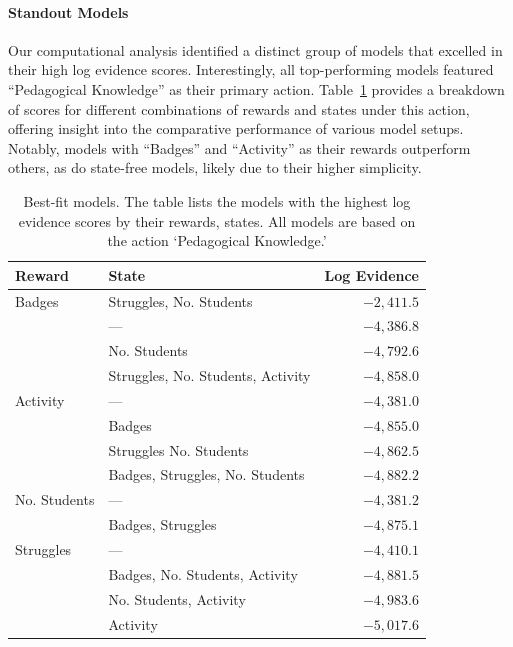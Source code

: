 \documentclass[
  number,
  preprint,
  3p,
  onecolumn]{elsarticle}
\let\oldparagraph\paragraph
\renewcommand{\paragraph}[1]{\oldparagraph{#1}\mbox{}}
\begin{document}
\paragraph{Standout Models}\label{standout-models}

Our computational analysis identified a distinct group of models that
excelled in their high log evidence scores. Interestingly, all
top-performing models featured ``Pedagogical Knowledge'' as their
primary action. Table~\ref{tbl-top-CBM} provides a breakdown of scores
for different combinations of rewards and states under this action,
offering insight into the comparative performance of various model
setups. Notably, models with ``Badges'' and ``Activity'' as their
rewards outperform others, as do state-free models, likely due to their
higher simplicity.

\begin{longtable}{l|lr}

\caption{\label{tbl-top-CBM}Best-fit models. The table lists the models
with the highest log evidence scores by their rewards, states. All
models are based on the action `Pedagogical Knowledge.'}

\tabularnewline

\toprule
\multicolumn{1}{l}{Reward} & State & Log Evidence \\ 
\midrule\addlinespace[2.5pt]
Badges & Struggles, No. Students & $-2,411.5$ \\ 
 & — & $-4,386.8$ \\ 
 & No. Students & $-4,792.6$ \\ 
 & Struggles, No. Students, Activity & $-4,858.0$ \\ 
\midrule\addlinespace[2.5pt]
Activity & — & $-4,381.0$ \\ 
 & Badges & $-4,855.0$ \\ 
 & Struggles No. Students & $-4,862.5$ \\ 
 & Badges, Struggles, No. Students & $-4,882.2$ \\ 
\midrule\addlinespace[2.5pt]
No. Students & — & $-4,381.2$ \\ 
 & Badges, Struggles & $-4,875.1$ \\ 
\midrule\addlinespace[2.5pt]
Struggles & — & $-4,410.1$ \\ 
 & Badges, No. Students, Activity & $-4,881.5$ \\ 
 & No. Students, Activity & $-4,983.6$ \\ 
 & Activity & $-5,017.6$ \\ 
\bottomrule

\end{longtable}
\end{document}
